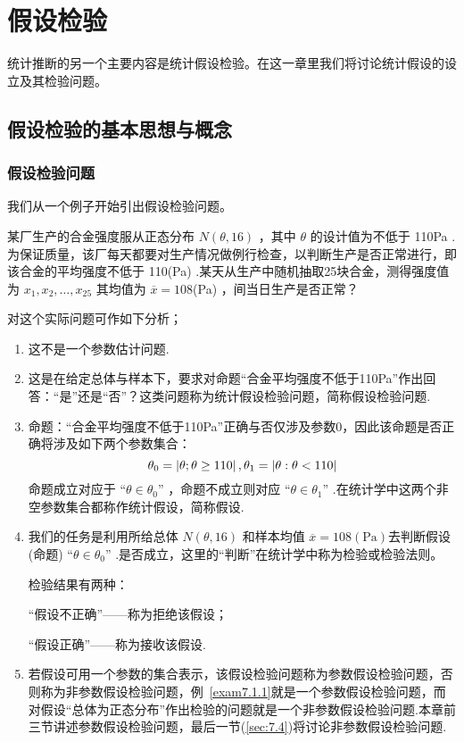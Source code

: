 \chapter{假设检验\label{cha:7}}
统计推断的另一个主要内容是统计假设检验。在这一章里我们将讨论统计假设的设立及其检验问题。

\section{假设检验的基本思想与概念\label{sec:7.1}}
\subsection{假设检验问题\label{7.1.1}}
我们从一个例子开始引出假设检验问题。
\begin{example}\label{exam7.1.1}
某厂生产的合金强度服从正态分布 $N(\theta,16)$ ，其中 $\theta$ 的设计值为不低于 110Pa .为保证质量，该厂每天都要对生产情况做例行检查，以判断生产是否正常进行，即该合金的平均强度不低于 110(Pa) .某天从生产中随机抽取25块合金，测得强度值为 $x_{1},x_{2},\dotsc,x_{25}$ 其均值为 $\overline{x}=108$(Pa) ，间当日生产是否正常？

对这个实际问题可作如下分析；
\begin{enumerate}
	\item 这不是一个参数估计问题.
	
	\item 这是在给定总体与样本下，要求对命题“合金平均强度不低于110Pa”作出回答：“是”还是“否”？这类问题称为统计假设检验问题，简称假设检验问题.
	
	\item 命题：“合金平均强度不低于110Pa”正确与否仅涉及参数0，因此该命题是否正确将涉及如下两个参数集合：
	\[
	\theta_0=\left|\theta ;\theta\geq 110\right|,\\\theta_1=\left|\theta :\theta <110\right|
	\]
	命题成立对应于 “$\theta\in\theta_0$” ，命题不成立则对应 “$\theta\in\theta_1$” .在统计学中这两个非空参数集合都称作统计假设，简称假设.
	\item 我们的任务是利用所给总体 $N(\theta,16)$ 和样本均值 $\overline{x}=108(\mathrm {Pa})$去判断假设(命题) “$\theta\in\theta_0$” .是否成立，这里的“判断”在统计学中称为检验或检验法则。
	
	检验结果有两种：
	\begin{center}
		“假设不正确”——称为拒绝该假设；
		
		“假设正确”——称为接收该假设.
	\end{center}
	\item 若假设可用一个参数的集合表示，该假设检验问题称为参数假设检验问题，否则称为非参数假设检验问题，例~\ref{exam7.1.1}就是一个参数假设检验问题，而对假设“总体为正态分布”作出检验的问题就是一个非参数假设检验问题.本章前三节讲述参数假设检验问题，最后一节(\ref{sec:7.4})将讨论非参数假设检验问题.
\end{enumerate}

\end{example}

